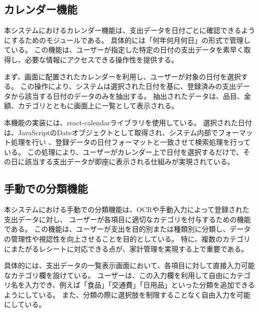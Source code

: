 \documentclass[main]{subfiles}
\begin{document}
\subsection{カレンダー機能}

本システムにおけるカレンダー機能は、支出データを日付ごとに確認できるようにするためのモジュールである。
具体的には「何年何月何日」の形式で管理している。
この機能は、ユーザーが指定した特定の日付の支出データを素早く取得し、必要な情報にアクセスできる操作性を提供する。

まず、画面に配置されたカレンダーを利用し、ユーザーが対象の日付を選択する。
この操作により、システムは選択された日付を基に、登録済みの支出データから該当する日付のデータのみを抽出する。
抽出されたデータは、品目、金額、カテゴリとともに画面上に一覧として表示される。

本機能の実装には、react-calendarライブラリを使用している。
選択された日付は、JavaScriptのDateオブジェクトとして取得され、システム内部でフォーマット処理を行い
、登録データの日付フォーマットと一致させて検索処理を行っている。
この処理により、ユーザーがカレンダー上で日付を選択するだけで、その日に該当する支出データが即座に表示される仕組みが実現されている。
\subsection{手動での分類機能}

本システムにおける手動での分類機能は、OCRや手動入力によって登録された支出データに対し、
ユーザーが各項目に適切なカテゴリを付与するための機能である。
この機能は、ユーザーが支出を目的別または種類別に分類し、データの管理性や視認性を向上させることを目的としている。
特に、複数のカテゴリにまたがるレシートに対応できる点が、家計管理を実現する上で重要である。

具体的には、支出データの一覧表示画面において、各項目に対して直接入力可能なカテゴリ欄を設けている。
ユーザーは、この入力欄を利用して自由にカテゴリ名を入力でき、例えば「食品」「交通費」「日用品」といった分類を追加できるようにしている。
また、分類の際に選択肢を制限することなく自由入力を可能にしている。
\end{document}

